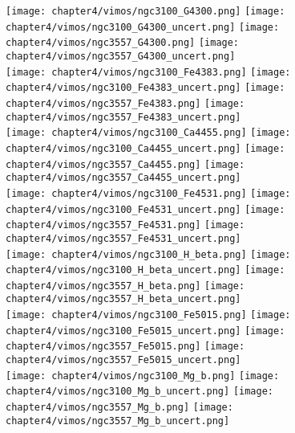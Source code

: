 \begin{figure*}
	\centering
	\texttt{[image: chapter4/vimos/ngc3100\_G4300.png]}
	\texttt{[image: chapter4/vimos/ngc3100\_G4300\_uncert.png]}
	\texttt{[image: chapter4/vimos/ngc3557\_G4300.png]}
	\texttt{[image: chapter4/vimos/ngc3557\_G4300\_uncert.png]}
	\\
	\texttt{[image: chapter4/vimos/ngc3100\_Fe4383.png]}
	\texttt{[image: chapter4/vimos/ngc3100\_Fe4383\_uncert.png]}
	\texttt{[image: chapter4/vimos/ngc3557\_Fe4383.png]}
	\texttt{[image: chapter4/vimos/ngc3557\_Fe4383\_uncert.png]}
	\\
	\texttt{[image: chapter4/vimos/ngc3100\_Ca4455.png]}
	\texttt{[image: chapter4/vimos/ngc3100\_Ca4455\_uncert.png]}
	\texttt{[image: chapter4/vimos/ngc3557\_Ca4455.png]}
	\texttt{[image: chapter4/vimos/ngc3557\_Ca4455\_uncert.png]}
	\\
	\texttt{[image: chapter4/vimos/ngc3100\_Fe4531.png]}
	\texttt{[image: chapter4/vimos/ngc3100\_Fe4531\_uncert.png]}
	\texttt{[image: chapter4/vimos/ngc3557\_Fe4531.png]}
	\texttt{[image: chapter4/vimos/ngc3557\_Fe4531\_uncert.png]}
	\\
	\texttt{[image: chapter4/vimos/ngc3100\_H\_beta.png]}
	\texttt{[image: chapter4/vimos/ngc3100\_H\_beta\_uncert.png]}
	\texttt{[image: chapter4/vimos/ngc3557\_H\_beta.png]}
	\texttt{[image: chapter4/vimos/ngc3557\_H\_beta\_uncert.png]}
	\\
	\texttt{[image: chapter4/vimos/ngc3100\_Fe5015.png]}
	\texttt{[image: chapter4/vimos/ngc3100\_Fe5015\_uncert.png]}
	\texttt{[image: chapter4/vimos/ngc3557\_Fe5015.png]}
	\texttt{[image: chapter4/vimos/ngc3557\_Fe5015\_uncert.png]}
	\\
	\texttt{[image: chapter4/vimos/ngc3100\_Mg\_b.png]}
	\texttt{[image: chapter4/vimos/ngc3100\_Mg\_b\_uncert.png]}
	\texttt{[image: chapter4/vimos/ngc3557\_Mg\_b.png]}
	\texttt{[image: chapter4/vimos/ngc3557\_Mg\_b\_uncert.png]}
	\\
\end{figure*}

